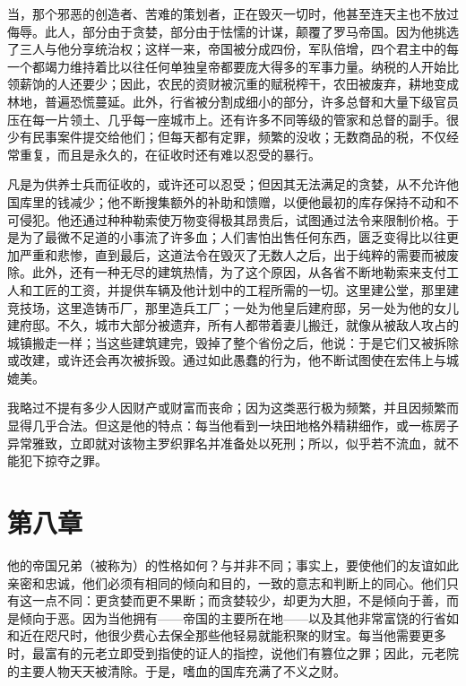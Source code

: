 当，那个邪恶的创造者、苦难的策划者，正在毁灭一切时，他甚至连天主也不放过侮辱。此人，部分由于贪婪，部分由于怯懦的计谋，颠覆了罗马帝国。因为他挑选了三人与他分享统治权；这样一来，帝国被分成四份，军队倍增，四个君主中的每一个都竭力维持着比以往任何单独皇帝都要庞大得多的军事力量。纳税的人开始比领薪饷的人还要少；因此，农民的资财被沉重的赋税榨干，农田被废弃，耕地变成林地，普遍恐慌蔓延。此外，行省被分割成细小的部分，许多总督和大量下级官员压在每一片领土、几乎每一座城市上。还有许多不同等级的管家和总督的副手。很少有民事案件提交给他们；但每天都有定罪，频繁的没收；无数商品的税，不仅经常重复，而且是永久的，在征收时还有难以忍受的暴行。\par

凡是为供养士兵而征收的，或许还可以忍受；但因其无法满足的贪婪，从不允许他国库里的钱减少；他不断搜集额外的补助和馈赠，以便他最初的库存保持不动和不可侵犯。他还通过种种勒索使万物变得极其昂贵后，试图通过法令来限制价格。于是为了最微不足道的小事流了许多血；人们害怕出售任何东西，匮乏变得比以往更加严重和悲惨，直到最后，这道法令在毁灭了无数人之后，出于纯粹的需要而被废除。此外，还有一种无尽的建筑热情，为了这个原因，从各省不断地勒索来支付工人和工匠的工资，并提供车辆及他计划中的工程所需的一切。这里建公堂，那里建竞技场，这里造铸币厂，那里造兵工厂；一处为他皇后建府邸，另一处为他的女儿建府邸。不久，城市大部分被遗弃，所有人都带着妻儿搬迁，就像从被敌人攻占的城镇搬走一样；当这些建筑建完，毁掉了整个省份之后，他说：于是它们又被拆除或改建，或许还会再次被拆毁。通过如此愚蠢的行为，他不断试图使在宏伟上与城媲美。\par

我略过不提有多少人因财产或财富而丧命；因为这类恶行极为频繁，并且因频繁而显得几乎合法。但这是他的特点：每当他看到一块田地格外精耕细作，或一栋房子异常雅致，立即就对该物主罗织罪名并准备处以死刑；所以，似乎若不流血，就不能犯下掠夺之罪。\par


\section{第八章}

他的帝国兄弟（被称为）的性格如何？与并非不同；事实上，要使他们的友谊如此亲密和忠诚，他们必须有相同的倾向和目的，一致的意志和判断上的同心。他们只有这一点不同：更贪婪而更不果断；而贪婪较少，却更为大胆，不是倾向于善，而是倾向于恶。因为当他拥有——帝国的主要所在地——以及其他非常富饶的行省如和近在咫尺时，他很少费心去保全那些他轻易就能积聚的财宝。每当他需要更多时，最富有的元老立即受到指使的证人的指控，说他们有篡位之罪；因此，元老院的主要人物天天被清除。于是，嗜血的国库充满了不义之财。\par

